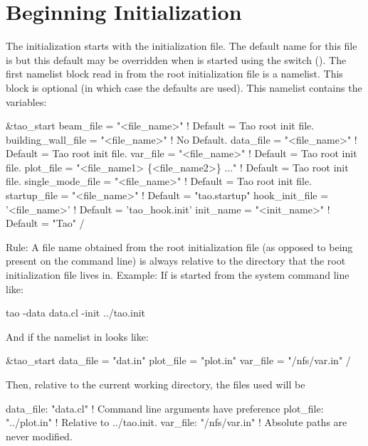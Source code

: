 \section{Beginning Initialization}
\label{s:init.global} 

The initialization starts with the  \tao initialization file. The default name for this
file is  but this default may be overridden when \tao is started using the 
switch (). The first namelist block read in from the root initialization file is a
 namelist. This block is optional (in which case the defaults are used).  This
namelist contains the variables:
\begin{example}
  &tao_start
    beam_file          = "<file_name>"  ! Default = Tao root init file.
    building_wall_file = "<file_name>"  ! No Default.
    data_file          = "<file_name>"  ! Default = Tao root init file.
    var_file           = "<file_name>"  ! Default = Tao root init file.
    plot_file          = "<file_name1> \{<file_name2>\} ..."  
                                        ! Default = Tao root init file.
    single_mode_file   = "<file_name>"  ! Default = Tao root init file.
    startup_file       = "<file_name>"  ! Default = "tao.startup"
    hook_init_file     = '<file_name>'  ! Default = 'tao_hook.init'
    init_name          = "<init_name>"  ! Default = "Tao"
  /
\end{example}
Rule: A file name obtained from the \tao root initialization file (as opposed to
being present on the command line) is always relative to the directory
that the \tao root initialization file lives in. Example: If \tao is started from
the system command line like:
\begin{example}
    tao -data data.cl -init ../tao.init
\end{example}
And if the  namelist in  looks like:
\begin{example}
  &tao_start
    data_file = "dat.in"
    plot_file = "plot.in"
    var_file  = "/nfs/var.in"
  /
\end{example}
Then, relative to the current working directory, the files used will be
\begin{example}
  data_file: "data.cl"      ! Command line arguments have preference
  plot_file: "../plot.in"   ! Relative to ../tao.init.
  var_file:  "/nfs/var.in"  ! Absolute paths are never modified.
\end{example}

